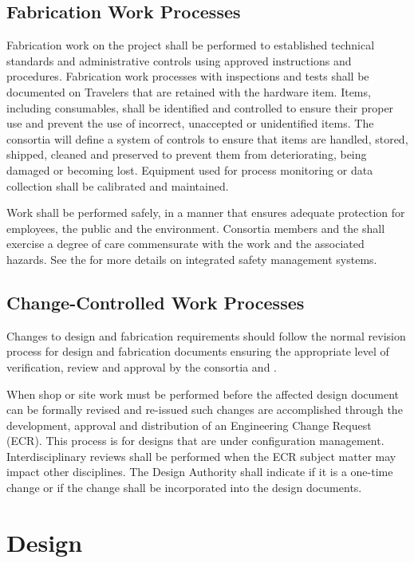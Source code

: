 \subsection{Fabrication Work Processes}

Fabrication work on the  project shall be performed to
established technical standards and administrative controls using
approved instructions and procedures. Fabrication work processes with
 inspections and tests shall be documented on Travelers that
are retained with the hardware item. Items, including consumables,
shall be identified and controlled to ensure their proper use and
prevent the use of incorrect, unaccepted or unidentified items. The
consortia will define a system of controls to ensure that items are
handled, stored, shipped, cleaned and preserved to prevent them from
deteriorating, being damaged or becoming lost. Equipment used for
process monitoring or data collection shall be calibrated and
maintained.

Work shall be performed safely, in a manner that ensures adequate
protection for employees, the public and the environment. Consortia
members and the   shall exercise a degree of
care commensurate with the work and the associated hazards. See the
  for more details on
 integrated safety management systems.

\subsection{Change-Controlled Work Processes}

Changes to design and fabrication requirements should follow the normal 
revision process for design and fabrication documents ensuring the 
appropriate level of verification, review and approval by the consortia 
and .


When shop or site work must be performed before the affected design 
document can be formally revised and re-issued such changes are 
accomplished through the development, approval and distribution of an 
Engineering Change Request (ECR). This process is for designs that are 
under configuration management. Interdisciplinary reviews shall be 
performed when the ECR subject matter may impact other disciplines. The 
Design Authority shall indicate if it is a one-time change or if the 
change shall be incorporated into the design documents.

\section{Design}

